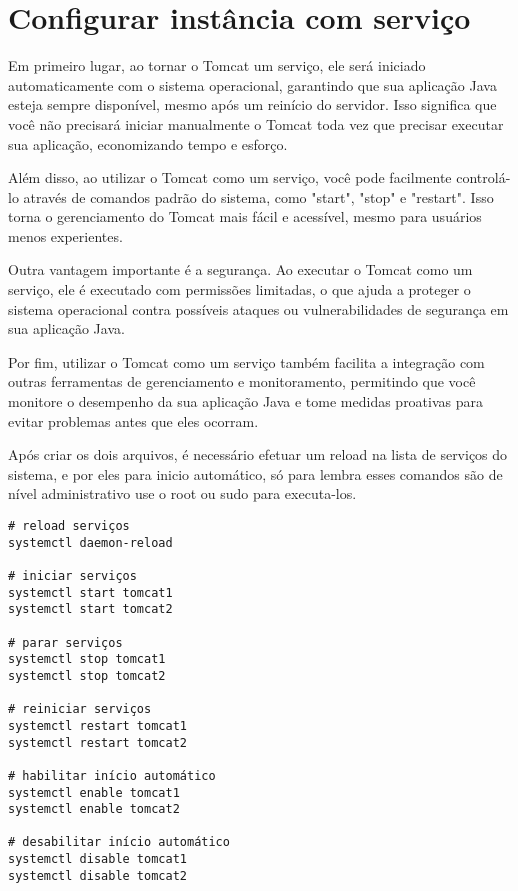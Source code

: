 \appendix
\section{Configurar instância com serviço}\label{apendice:servico}

Em primeiro lugar, ao tornar o Tomcat um serviço, ele será iniciado automaticamente com o sistema operacional, garantindo que sua aplicação Java esteja sempre disponível, mesmo após um reinício do servidor. Isso significa que você não precisará iniciar manualmente o Tomcat toda vez que precisar executar sua aplicação, economizando tempo e esforço.

Além disso, ao utilizar o Tomcat como um serviço, você pode facilmente controlá-lo através de comandos padrão do sistema, como "start", "stop" e "restart". Isso torna o gerenciamento do Tomcat mais fácil e acessível, mesmo para usuários menos experientes.

Outra vantagem importante é a segurança. Ao executar o Tomcat como um serviço, ele é executado com permissões limitadas, o que ajuda a proteger o sistema operacional contra possíveis ataques ou vulnerabilidades de segurança em sua aplicação Java.

Por fim, utilizar o Tomcat como um serviço também facilita a integração com outras ferramentas de gerenciamento e monitoramento, permitindo que você monitore o desempenho da sua aplicação Java e tome medidas proativas para evitar problemas antes que eles ocorram.

Após criar os dois arquivos, é necessário efetuar um reload na lista de serviços do sistema, e por eles para inicio automático, só para lembra esses comandos são de nível administrativo use o root ou sudo para executa-los.

\begin{verbatim}
# reload serviços
systemctl daemon-reload

# iniciar serviços
systemctl start tomcat1
systemctl start tomcat2

# parar serviços
systemctl stop tomcat1
systemctl stop tomcat2

# reiniciar serviços
systemctl restart tomcat1
systemctl restart tomcat2

# habilitar início automático
systemctl enable tomcat1
systemctl enable tomcat2

# desabilitar início automático
systemctl disable tomcat1
systemctl disable tomcat2

\end{verbatim}

